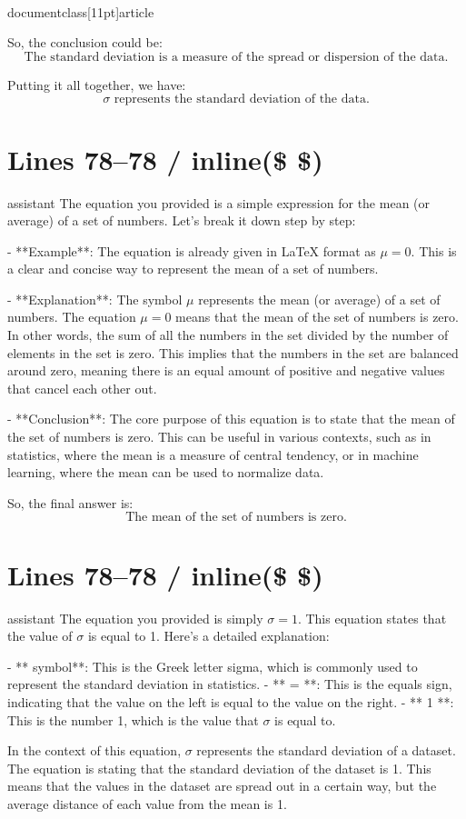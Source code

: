 \\documentclass[11pt]{article}
\begin{document}
So, the conclusion could be:
\[
\text{The standard deviation is a measure of the spread or dispersion of the data.}
\]

Putting it all together, we have:
\[
\boxed{\sigma \text{ represents the standard deviation of the data.}}
\]


\section*{Lines 78–78 / inline(\$ \$) }
assistant
The equation you provided is a simple expression for the mean (or average) of a set of numbers. Let's break it down step by step:

- **Example**: The equation is already given in LaTeX format as \(\mu = 0\). This is a clear and concise way to represent the mean of a set of numbers.

- **Explanation**: The symbol \(\mu\) represents the mean (or average) of a set of numbers. The equation \(\mu = 0\) means that the mean of the set of numbers is zero. In other words, the sum of all the numbers in the set divided by the number of elements in the set is zero. This implies that the numbers in the set are balanced around zero, meaning there is an equal amount of positive and negative values that cancel each other out.

- **Conclusion**: The core purpose of this equation is to state that the mean of the set of numbers is zero. This can be useful in various contexts, such as in statistics, where the mean is a measure of central tendency, or in machine learning, where the mean can be used to normalize data.

So, the final answer is:
\[
\boxed{\text{The mean of the set of numbers is zero.}}
\]


\section*{Lines 78–78 / inline(\$ \$) }
assistant
The equation you provided is simply \(\sigma = 1\). This equation states that the value of \(\sigma\) is equal to 1. Here's a detailed explanation:

- ** symbol**: This is the Greek letter sigma, which is commonly used to represent the standard deviation in statistics.
- ** = **: This is the equals sign, indicating that the value on the left is equal to the value on the right.
- ** 1 **: This is the number 1, which is the value that \(\sigma\) is equal to.

In the context of this equation, \(\sigma\) represents the standard deviation of a dataset. The equation is stating that the standard deviation of the dataset is 1. This means that the values in the dataset are spread out in a certain way, but the average distance of each value from the mean is 1.
\end{document}
